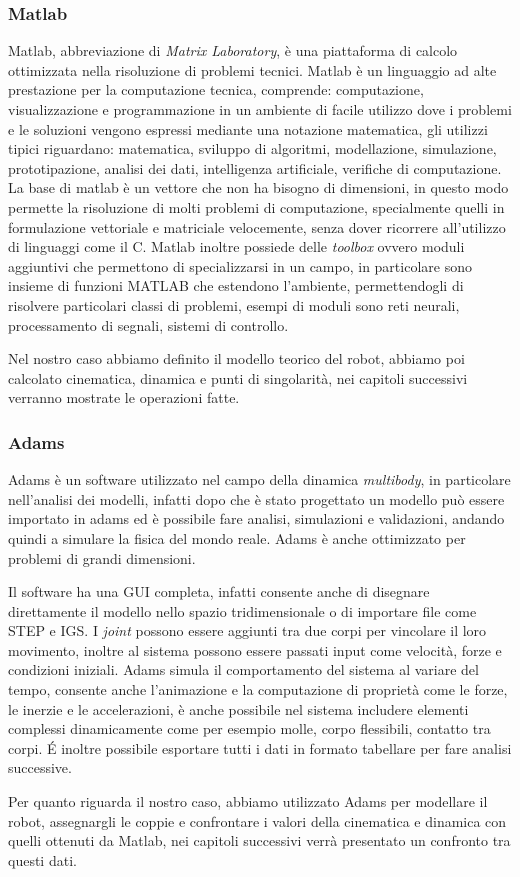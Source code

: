 \subsubsection{Matlab}
Matlab, abbreviazione di \textit{Matrix Laboratory}, è una piattaforma di calcolo ottimizzata nella risoluzione di problemi tecnici. 
Matlab è un linguaggio ad alte prestazione per la computazione tecnica, comprende: computazione, visualizzazione e programmazione in un ambiente di facile utilizzo dove i problemi e le soluzioni vengono espressi mediante una notazione matematica, gli utilizzi tipici riguardano: matematica, sviluppo di algoritmi, modellazione, simulazione, prototipazione, analisi dei dati, intelligenza artificiale, verifiche di computazione. La base di matlab è un vettore che non ha bisogno di dimensioni, in questo modo permette la risoluzione di molti problemi di computazione, specialmente quelli in formulazione vettoriale e matriciale velocemente, senza dover ricorrere all'utilizzo di linguaggi come il C. Matlab inoltre possiede delle \textit{toolbox} ovvero moduli aggiuntivi che permettono di specializzarsi in un campo, in particolare sono insieme di funzioni MATLAB che estendono l'ambiente, permettendogli di risolvere particolari classi di problemi, esempi di moduli sono reti neurali, processamento di segnali, sistemi di controllo.
\par Nel nostro caso abbiamo definito il modello teorico del robot, abbiamo poi calcolato cinematica, dinamica e punti di singolarità, nei capitoli successivi verranno mostrate le operazioni fatte. 
\subsubsection{Adams}
Adams è un software utilizzato nel campo della dinamica \textit{multibody}, in particolare nell'analisi dei modelli, infatti dopo che è stato progettato un modello può essere importato in adams ed è possibile fare analisi, simulazioni e validazioni, andando quindi a simulare la fisica del mondo reale. Adams è anche ottimizzato per problemi di grandi dimensioni.
\par Il software ha una GUI completa, infatti consente anche di disegnare direttamente il modello nello spazio tridimensionale o di importare file come STEP e IGS. I \textit{joint} possono essere aggiunti tra due corpi per vincolare il loro movimento, inoltre al sistema possono essere passati input come velocità, forze e condizioni iniziali. Adams simula il comportamento del sistema al variare del tempo, consente anche l'animazione e la computazione di proprietà come le forze, le inerzie e le accelerazioni, è anche possibile nel sistema includere elementi complessi dinamicamente come per esempio molle, corpo flessibili, contatto tra corpi.
É inoltre possibile esportare tutti i dati in formato tabellare per fare analisi successive. 
\par Per quanto riguarda il nostro caso, abbiamo utilizzato Adams per modellare il robot, assegnargli le coppie e confrontare i valori della cinematica e dinamica con quelli ottenuti da Matlab, nei capitoli successivi verrà presentato un confronto tra questi dati.